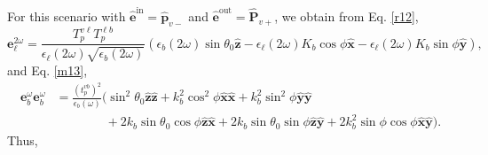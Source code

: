For this scenario with $\hat{\mathbf{e}}^{\mathrm{in}}=\hat{\mathbf{p}}_{v-}$
and $\hat{\mathbf{e}}^{\mathrm{out}}=\hat{\mathbf{P}}_{v+}$, we obtain from Eq.
\eqref{r12},
\begin{equation*}\label{ri12}
\mathbf{e}^{2\omega}_{\ell} =
\frac{T^{v\ell}_{p}T^{\ell b}_{p}}
     {\epsilon_{\ell}({2\omega})\sqrt{\epsilon_{b}(2\omega)}}
\left(
  \epsilon_{b}(2\omega)\sin\theta_{0}\hat{\mathbf{z}}
- \epsilon_{\ell}(2\omega)K_{b}\cos\phi\hat{\mathbf{x}}
- \epsilon_{\ell}(2\omega)K_{b}\sin\phi\hat{\mathbf{y}}
\right),
\end{equation*}
and Eq. \eqref{m13},
\begin{equation*}
\begin{split}
\mathbf{e}^{\omega}_{b}\mathbf{e}^{\omega}_{b}
&= \frac{\left(t^{vb}_{p}\right)^{2}}{\epsilon_{b}(\omega)}
\big(
  \sin^{2}\theta_{0}\hat{\mathbf{z}}\hat{\mathbf{z}}
+ k^{2}_{b}\cos^{2}\phi\hat{\mathbf{x}}\hat{\mathbf{x}}
+ k^{2}_{b}\sin^{2}\phi\hat{\mathbf{y}}\hat{\mathbf{y}}\\
&\qquad\qquad
+ 2k_{b}\sin\theta_{0}\cos\phi\hat{\mathbf{z}}\hat{\mathbf{x}}
+ 2k_{b}\sin\theta_{0}\sin\phi\hat{\mathbf{z}}\hat{\mathbf{y}}
+ 2k^{2}_{b}\sin\phi\cos\phi\hat{\mathbf{x}}\hat{\mathbf{y}}
\big).
\end{split}
\end{equation*}
Thus,
